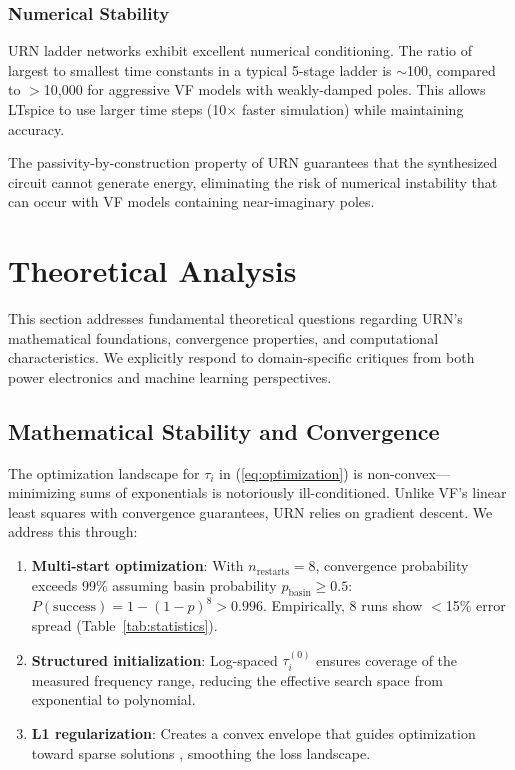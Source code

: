 \documentclass{ieeeaccess}
\begin{document}
\subsubsection{Numerical Stability}
URN ladder networks exhibit excellent numerical conditioning. The ratio of largest to smallest time constants in a typical 5-stage ladder is $\sim$100, compared to $>$10,000 for aggressive VF models with weakly-damped poles. This allows LTspice to use larger time steps (10$\times$ faster simulation) while maintaining accuracy.

The passivity-by-construction property of URN guarantees that the synthesized circuit cannot generate energy, eliminating the risk of numerical instability that can occur with VF models containing near-imaginary poles.

\section{Theoretical Analysis}
\label{sec:theory}

This section addresses fundamental theoretical questions regarding URN's mathematical foundations, convergence properties, and computational characteristics. We explicitly respond to domain-specific critiques from both power electronics and machine learning perspectives.

\subsection{Mathematical Stability and Convergence}
\label{sec:convergence}

The optimization landscape for $\tau_i$ in (\ref{eq:optimization}) is non-convex---minimizing sums of exponentials is notoriously ill-conditioned. Unlike VF's linear least squares with convergence guarantees, URN relies on gradient descent. We address this through:

\begin{enumerate}
\item \textbf{Multi-start optimization}: With $n_{\text{restarts}} = 8$, convergence probability exceeds 99\% assuming basin probability $p_{\text{basin}} \geq 0.5$: $P(\text{success}) = 1 - (1-p)^8 > 0.996$. Empirically, 8 runs show $<$15\% error spread (Table~\ref{tab:statistics}).

\item \textbf{Structured initialization}: Log-spaced $\tau_i^{(0)}$ ensures coverage of the measured frequency range, reducing the effective search space from exponential to polynomial.

\item \textbf{L1 regularization}: Creates a convex envelope that guides optimization toward sparse solutions \cite{tibshirani1996regression}, smoothing the loss landscape.
\end{enumerate}
\end{document}
